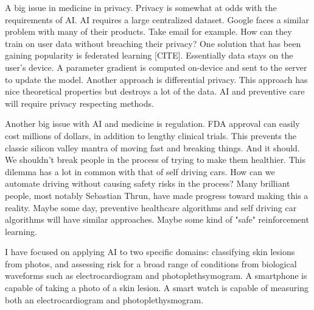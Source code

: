 A big issue in medicine in privacy.  Privacy is somewhat at odds with the requirements of AI.  AI requires a large centralized dataset.  Google faces a similar problem with many of their products.  Take email for example.  How can they train on user data without breaching their privacy?  One solution that has been gaining popularity is federated learning [CITE].  Essentially data stays on the user's device.  A parameter gradient is computed on-device and sent to the server to update the model.  Another approach is differential privacy.  This approach has nice theoretical properties but destroys a lot of the data.  AI and preventive care will require privacy respecting methods.

Another big issue with AI and medicine is regulation.  FDA approval can easily cost millions of dollars, in addition to lengthy clinical trials.  This prevents the classic silicon valley mantra of moving fast and breaking things.  And it should.  We shouldn't break people in the process of trying to make them healthier.  This dilemma has a lot in common with that of self driving cars.  How can we automate driving without causing safety risks in the process?  Many brilliant people, most notably Sebastian Thrun, have made progress toward making this a reality.  Maybe some day, preventive healthcare algorithms and self driving car algorithms will have similar approaches.  Maybe some kind of "safe" reinforcement learning.

I have focused on applying AI to two specific domains: classifying skin lesions from photos, and assessing risk for a broad range of conditions from biological waveforms such as electrocardiogram and photoplethsymogram.  A smartphone is capable of taking a photo of a skin lesion.  A smart watch is capable of measuring both an electrocardiogram and photoplethysmogram.

